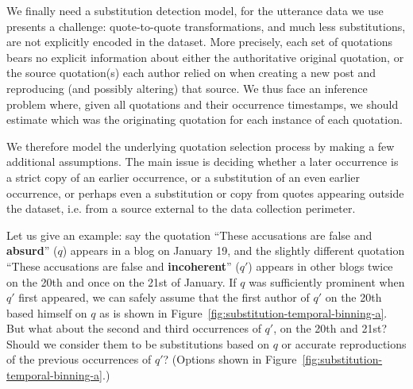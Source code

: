 \label{sec:temporal-binning}

We finally need a substitution detection model, for the utterance data we use presents a challenge: quote-to-quote transformations, and much less substitutions, are not explicitly encoded in the dataset. More precisely, each set of quotations bears no explicit information about either the authoritative original quotation, or the source quotation(s) each author relied on when creating a new post and reproducing (and possibly altering) that source.
We thus face an inference problem where, given all quotations and their occurrence timestamps, we should estimate which was the originating quotation for each instance of each quotation.

We therefore model the underlying quotation selection process by making a few additional assumptions.%
The main issue is deciding whether a later occurrence is a strict copy of an earlier occurrence, or a substitution of an even earlier occurrence, or perhaps even a substitution or copy from quotes appearing outside the dataset, \hbox{i.e.} from a source external to the data collection perimeter.

Let us give an example: say the quotation ``These accusations are false and \textbf{absurd}'' ($q$) appears in a blog on January 19, and the slightly different quotation ``These accusations are false and \textbf{incoherent}'' ($q'$) appears in other blogs twice on the 20th and once on the 21st of January.
If $q$ was sufficiently prominent when $q'$ first appeared, we can safely assume that the first author of $q'$ on the 20th based himself on $q$ as is shown in Figure~\ref{fig:substitution-temporal-binning-a}.
But what about the second and third occurrences of $q'$, on the 20th and 21st?
Should we consider them to be substitutions based on $q$ %
or accurate reproductions of the previous occurrences of $q'$? (Options shown in Figure~\ref{fig:substitution-temporal-binning-a}.)

